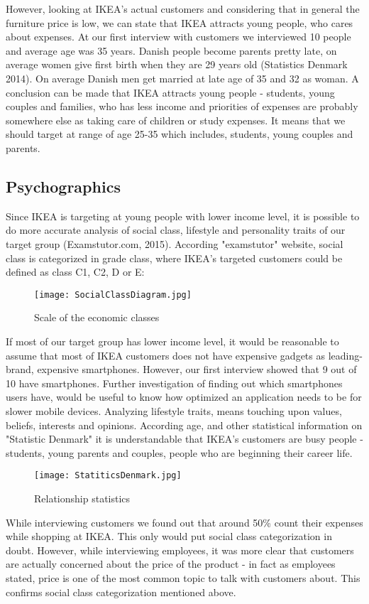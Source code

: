 However, looking at IKEA's actual customers and considering that in general the furniture price is low, we can state that IKEA attracts young people, who cares about expenses. At our first interview with customers we interviewed 10 people and average age was 35 years. Danish people become parents pretty late, on average women give first birth when they are 29 years old (Statistics Denmark 2014). On average Danish men get married at late age of 35 and 32 as woman. A conclusion can be made that IKEA attracts young people - students, young couples and families, who has less income and priorities of expenses are probably somewhere else as taking care of children or study expenses. It means that we should target at range of age 25-35 which includes, students, young couples and parents.  
\subsection{Psychographics}
Since IKEA is targeting at young people with lower income level, it is possible to do more accurate analysis of social class, lifestyle and personality traits of our target group (Examstutor.com,  2015). According "examstutor" website, social class is categorized in grade class, where IKEA’s targeted customers could be defined as class C1, C2, D or E:
\begin{figure}[H]
\centering
\texttt{[image: SocialClassDiagram.jpg]}
\caption{Scale of the economic classes}
\end{figure}
If most of our target group has lower income level, it would be reasonable to assume that most of IKEA customers does not have expensive gadgets as leading-brand, expensive smartphones. However, our first interview showed that 9 out of 10 have smartphones. Further investigation of finding out which smartphones users have, would be useful to know how optimized an application needs to be for slower mobile devices. 
Analyzing lifestyle traits, means touching upon values, beliefs, interests and opinions. According age, and other statistical information on "Statistic Denmark" it is understandable that IKEA’s customers are busy people - students, young parents and couples, people who are beginning their career life. 
\begin{figure}[H]
\centering
\texttt{[image: StatiticsDenmark.jpg]}
\caption{Relationship statistics}
\end{figure}
While interviewing customers we found out that around 50\% count their expenses  while shopping at IKEA. This only would put social class categorization in doubt. However, while interviewing employees, it was more clear that customers are actually concerned about the price of the product - in fact as employees stated, price is one of the most common topic to talk with customers about. This confirms social class categorization mentioned above. 
